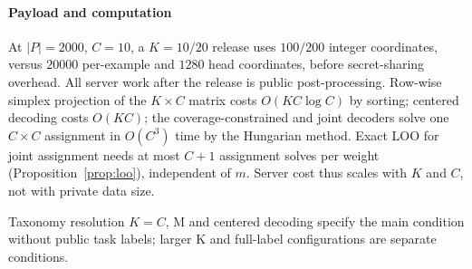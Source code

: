 \paragraph{Payload and computation}
At $|P|=2000$, $C=10$, a $K=10/20$ release uses $100/200$ integer
coordinates, versus $20000$ per-example and $1280$ head coordinates, before
secret-sharing overhead. All server work after the release is public
post-processing. Row-wise
simplex projection of the $K\times C$ matrix costs $O(KC\log C)$ by
sorting; centered decoding costs $O(KC)$; the coverage-constrained and joint
decoders solve one $C\times C$ assignment in $O(C^3)$ time by the Hungarian
method. Exact LOO for joint assignment needs at most $C+1$ assignment solves
per weight (Proposition~\ref{prop:loo}), independent of $m$. Server cost thus
scales with $K$ and $C$, not with private data size.

Taxonomy resolution $K=C$, M and centered decoding specify the main
condition without public task labels; larger K and full-label configurations
are separate conditions.

